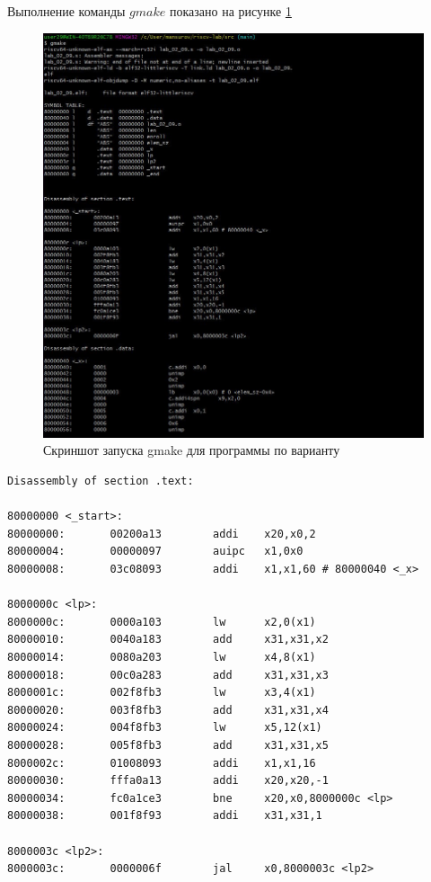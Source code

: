 Выполнение команды $gmake$  показано на рисунке \ref{img:t1-gamake}

\begin{figure}[h]
	\centering
	\includegraphics[height=0.8\textheight]{img/t1-gmake.jpg}
	\caption{Скриншот запуска gmake для программы по варианту}
	\label{img:t1-gamake}
\end{figure}

\clearpage

\begin{lstlisting}[label=lst:v22,caption=Дизассемблированный код]
Disassembly of section .text:

80000000 <_start>:
80000000:       00200a13        addi    x20,x0,2
80000004:       00000097        auipc   x1,0x0
80000008:       03c08093        addi    x1,x1,60 # 80000040 <_x>

8000000c <lp>:
8000000c:       0000a103        lw      x2,0(x1)
80000010:       0040a183        add     x31,x31,x2
80000014:       0080a203        lw      x4,8(x1)
80000018:       00c0a283        add     x31,x31,x3
8000001c:       002f8fb3        lw      x3,4(x1)
80000020:       003f8fb3        add     x31,x31,x4
80000024:       004f8fb3        lw      x5,12(x1)
80000028:       005f8fb3        add     x31,x31,x5
8000002c:       01008093        addi    x1,x1,16
80000030:       fffa0a13        addi    x20,x20,-1
80000034:       fc0a1ce3        bne     x20,x0,8000000c <lp>
80000038:       001f8f93        addi    x31,x31,1

8000003c <lp2>:
8000003c:       0000006f        jal     x0,8000003c <lp2>
\end{lstlisting}

